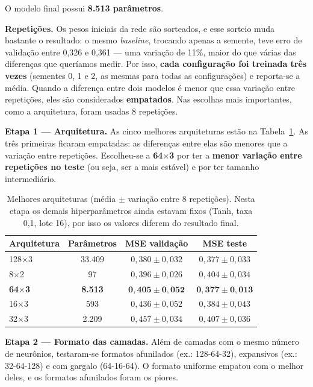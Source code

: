 \documentclass[11pt,a4paper]{article}
\begin{document}
O modelo final possui \textbf{8.513 parâmetros}.

\textbf{Repetições.} Os pesos iniciais da rede são sorteados, e esse sorteio muda bastante o resultado: o mesmo \textit{baseline}, trocando apenas a semente, teve erro de validação entre 0,326 e 0,361 --- uma variação de 11\%, maior do que várias das diferenças que queríamos medir. Por isso, \textbf{cada configuração foi treinada três vezes} (sementes 0, 1 e 2, as mesmas para todas as configurações) e reporta-se a média. Quando a diferença entre dois modelos é menor que essa variação entre repetições, eles são considerados \textbf{empatados}. Nas escolhas mais importantes, como a arquitetura, foram usadas 8 repetições.

\textbf{Etapa 1 --- Arquitetura.} As cinco melhores arquiteturas estão na Tabela~\ref{tab:arquiteturas}. As três primeiras ficaram empatadas: as diferenças entre elas são menores que a variação entre repetições. Escolheu-se a \textbf{64$\times$3} por ter a \textbf{menor variação entre repetições no teste} (ou seja, ser a mais estável) e por ter tamanho intermediário.

\begin{table}[h]
\centering
\small
\caption{Melhores arquiteturas (média $\pm$ variação entre 8 repetições). Nesta etapa os demais hiperparâmetros ainda estavam fixos (Tanh, taxa 0,1, lote 16), por isso os valores diferem do resultado final.}
\label{tab:arquiteturas}
\begin{tabular}{lccc}
\toprule
\textbf{Arquitetura} & \textbf{Parâmetros} & \textbf{MSE validação} & \textbf{MSE teste} \\
\midrule
128$\times$3 & 33.409 & $0{,}380 \pm 0{,}032$ & $0{,}377 \pm 0{,}033$ \\
8$\times$2 & 97 & $0{,}396 \pm 0{,}026$ & $0{,}404 \pm 0{,}034$ \\
\textbf{64$\times$3} & \textbf{8.513} & $\mathbf{0{,}405 \pm 0{,}052}$ & $\mathbf{0{,}377 \pm 0{,}013}$ \\
16$\times$3 & 593 & $0{,}436 \pm 0{,}052$ & $0{,}384 \pm 0{,}043$ \\
32$\times$3 & 2.209 & $0{,}457 \pm 0{,}034$ & $0{,}407 \pm 0{,}036$ \\
\bottomrule
\end{tabular}
\end{table}

\textbf{Etapa 2 --- Formato das camadas.} Além de camadas com o mesmo número de neurônios, testaram-se formatos afunilados (ex.: 128-64-32), expansivos (ex.: 32-64-128) e com gargalo (64-16-64). O formato uniforme empatou com o melhor deles, e os formatos afunilados foram os piores.
\end{document}
